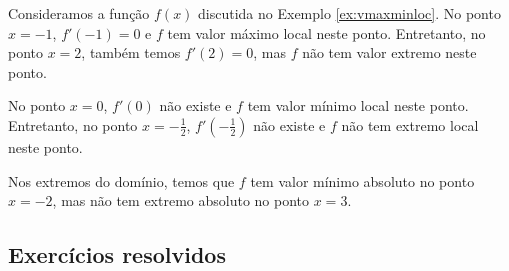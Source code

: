 \begin{ex}
  Consideramos a função $f(x)$ discutida no Exemplo \ref{ex:vmaxminloc}. No ponto $x=-1$, $f'(-1)=0$ e $f$ tem valor máximo local neste ponto. Entretanto, no ponto $x=2$, também temos $f'(2)=0$, mas $f$ não tem valor extremo neste ponto.

  No ponto $x=0$, $f'(0)$ não existe e $f$ tem valor mínimo local neste ponto. Entretanto, no ponto $x=-\frac{1}{2}$, $f'\left(-\frac{1}{2}\right)$ não existe e $f$ não tem extremo local neste ponto.

  Nos extremos do domínio, temos que $f$ tem valor mínimo absoluto no ponto $x=-2$, mas não tem extremo absoluto no ponto $x=3$.
\end{ex}

\subsection{Exercícios resolvidos}

